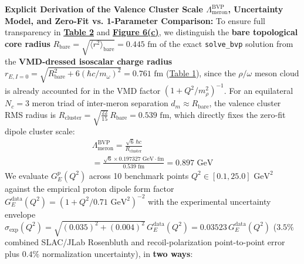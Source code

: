 \documentclass[10pt,aps,prd,twocolumn,superscriptaddress,nofootinbib,floatfix,longbibliography,showkeys]{revtex4-2}
\begin{document}
\textbf{Explicit Derivation of the Valence Cluster Scale $\Lambda_{\text{meron}}^{\text{BVP}}$, Uncertainty Model, and Zero-Fit vs. 1-Parameter Comparison:}
To ensure full transparency in \textbf{\hyperref[tab:table2]{Table 2}} and \textbf{\hyperref[fig:fig6]{Figure 6(c)}}, we distinguish the \textbf{bare topological core radius} $R_{\text{bare}} = \sqrt{\langle r^2\rangle_{\text{bare}}} = 0.445\text{ fm}$ of the exact \texttt{solve\_bvp} solution from the \textbf{VMD-dressed isoscalar charge radius} $r_{E,I=0} = \sqrt{R_{\text{bare}}^2 + 6(\hbar c/m_\omega)^2} = 0.761\text{ fm}$ (\hyperref[tab:table1]{Table 1}), since the $\rho/\omega$ meson cloud is already accounted for in the VMD factor $(1 + Q^2/m_\rho^2)^{-1}$. For an equilateral $N_c = 3$ meron triad of inter-meron separation $d_m \approx R_{\text{bare}}$, the valence cluster RMS radius is $R_{\text{cluster}} = \sqrt{\frac{22}{15}}\,R_{\text{bare}} = 0.539\text{ fm}$, which directly fixes the zero-fit dipole cluster scale:
\begin{multline}
\Lambda_{\text{meron}}^{\text{BVP}} = \frac{\sqrt{6}\,\hbar c}{R_{\text{cluster}}} \\
= \frac{\sqrt{6} \times 0.197327\text{ GeV}\cdot\text{fm}}{0.539\text{ fm}} = 0.897\text{ GeV}
\end{multline}
We evaluate $G_E^p(Q^2)$ across 10 benchmark points $Q^2 \in [0.1, 25.0]\text{ GeV}^2$ against the empirical proton dipole form factor $G_E^{\text{data}}(Q^2) = (1 + Q^2/0.71\text{ GeV}^2)^{-2}$ with the experimental uncertainty envelope $\sigma_{\text{exp}}(Q^2) = \sqrt{(0.035)^2 + (0.004)^2}\,G_E^{\text{data}}(Q^2) = 0.03523\,G_E^{\text{data}}(Q^2)$ ($3.5\%$ combined SLAC/JLab Rosenbluth and recoil-polarization point-to-point error plus $0.4\%$ normalization uncertainty), in \textbf{two ways}:
\end{document}
